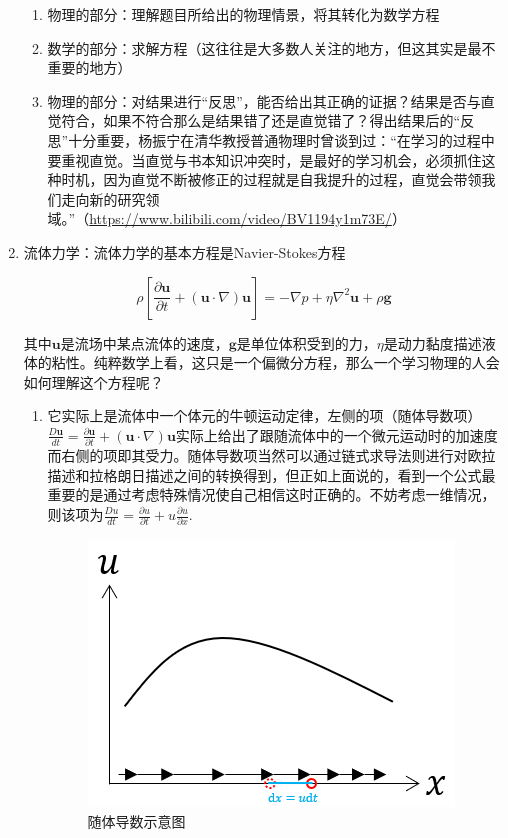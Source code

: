 \documentclass{ctexart}
\begin{document}
\begin{myexample}
\begin{enumerate}[leftmargin=*, labelsep=0.5em]
    \begin{enumerate}[leftmargin=*, labelsep=0.5em]
      \item 物理的部分：理解题目所给出的物理情景，将其转化为数学方程
      \item 数学的部分：求解方程（这往往是大多数人关注的地方，但这其实是最不重要的地方）
      \item 物理的部分：对结果进行“反思”，能否给出其正确的证据？结果是否与直觉符合，如果不符合那么是结果错了还是直觉错了？得出结果后的“反思”十分重要，杨振宁在清华教授普通物理时曾谈到过：“在学习的过程中要重视直觉。当直觉与书本知识冲突时，是最好的学习机会，必须抓住这种时机，因为直觉不断被修正的过程就是自我提升的过程，直觉会带领我们走向新的研究领域。”（\url{https://www.bilibili.com/video/BV1194y1m73E/}）
    \end{enumerate}
    
    \item 流体力学：流体力学的基本方程是Navier-Stokes方程
    
    \begin{equation*}
    \rho\left\lbrack \frac{\partial\mathbf{u}}{\partial t} + \left( \mathbf{u} \cdot \nabla \right)\mathbf{u} \right\rbrack\mathbf{= -}\nabla p + \eta\nabla^{2}\mathbf{u} + \rho\mathbf{g}
    \end{equation*}
    
    其中$\mathbf{u}$是流场中某点流体的速度，$\mathbf{g}$是单位体积受到的力，$\eta$是动力黏度描述液体的粘性。纯粹数学上看，这只是一个偏微分方程，那么一个学习物理的人会如何理解这个方程呢？
    
    \begin{enumerate}[leftmargin=*, labelsep=0.5em]
      \item 它实际上是流体中一个体元的牛顿运动定律，左侧的项（随体导数项）$\frac{D\mathbf{u}}{dt} = \frac{\partial\mathbf{u}}{\partial t} + \left( \mathbf{u} \cdot \nabla \right)\mathbf{u}$实际上给出了跟随流体中的一个微元运动时的加速度而右侧的项即其受力。随体导数项当然可以通过链式求导法则进行对欧拉描述和拉格朗日描述之间的转换得到，但正如上面说的，看到一个公式最重要的是通过考虑特殊情况使自己相信这时正确的。不妨考虑一维情况，则该项为$\frac{Du}{dt} = \frac{\partial u}{\partial t} + u\frac{\partial u}{\partial x}$.
      
      \begin{figure}[H]
        \centering
        \includegraphics[width=.35\linewidth]{fig/速度场.png}
        \caption{随体导数示意图}
        \label{fig:derivative}
      \end{figure}
        

\end{enumerate}
\end{enumerate}
\end{myexample}
\end{document}
